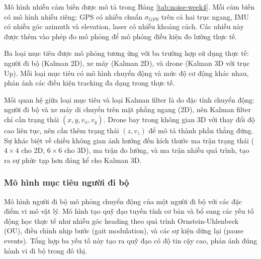 Mô hình nhiễu cảm biến được mô tả trong Bảng \ref{tab:noise-week4}. Mỗi cảm biến có mô hình nhiễu riêng: GPS có nhiễu chuẩn $\sigma_{GPS}$ trên cả hai trục ngang, IMU có nhiễu góc azimuth và elevation, laser có nhiễu khoảng cách. Các nhiễu này được thêm vào phép đo mô phỏng để mô phỏng điều kiện đo lường thực tế.

\begin{table}[H]
\centering
\caption{Thông số nhiễu cảm biến trong mô phỏng}
\label{tab:noise-week4}
\end{table}

Ba loại mục tiêu được mô phỏng tương ứng với ba trường hợp sử dụng thực tế: người đi bộ (Kalman 2D), xe máy (Kalman 2D), và drone (Kalman 3D với trục Up). Mỗi loại mục tiêu có mô hình chuyển động và mức độ cơ động khác nhau, phản ánh các điều kiện tracking đa dạng trong thực tế.

Mối quan hệ giữa loại mục tiêu và loại Kalman filter là do đặc tính chuyển động: người đi bộ và xe máy di chuyển trên mặt phẳng ngang (2D), nên Kalman filter chỉ cần trạng thái $(x, y, v_x, v_y)$. Drone bay trong không gian 3D với thay đổi độ cao liên tục, nên cần thêm trạng thái $(z, v_z)$ để mô tả thành phần thẳng đứng. Sự khác biệt về chiều không gian ảnh hưởng đến kích thước ma trận trạng thái ($4 \times 4$ cho 2D, $6 \times 6$ cho 3D), ma trận đo lường, và ma trận nhiễu quá trình, tạo ra sự phức tạp hơn đáng kể cho Kalman 3D.

\subsubsection{Mô hình mục tiêu người đi bộ}

\hspace{0.5cm} Mô hình người đi bộ mô phỏng chuyển động của một người đi bộ với các đặc điểm vi mô vật lý. Mô hình tạo quỹ đạo tuyến tính cơ bản và bổ sung các yếu tố động học thực tế như nhiễu góc heading theo quá trình Ornstein-Uhlenbeck (OU), điều chỉnh nhịp bước (gait modulation), và các sự kiện dừng lại (pause events). Tổng hợp ba yếu tố này tạo ra quỹ đạo có độ tin cậy cao, phản ánh đúng hành vi đi bộ trong đô thị.

